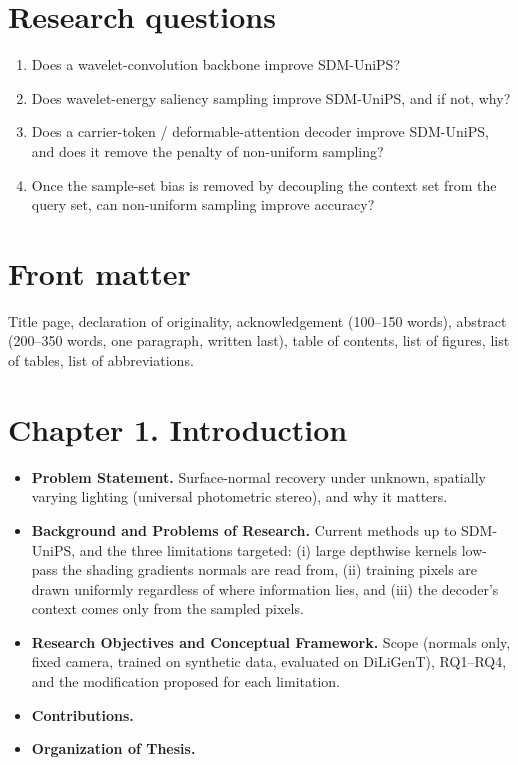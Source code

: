 \documentclass[Main.tex]{subfiles}
\begin{document}
\section*{Research questions}

\begin{enumerate}[label=\textbf{RQ\arabic*.}, leftmargin=*]
  \item Does a wavelet-convolution backbone improve SDM-UniPS?
  \item Does wavelet-energy saliency sampling improve SDM-UniPS, and if not, why?
  \item Does a carrier-token / deformable-attention decoder improve SDM-UniPS, and does it remove
    the penalty of non-uniform sampling?
  \item Once the sample-set bias is removed by decoupling the context set from the query set, can
    non-uniform sampling improve accuracy?
\end{enumerate}

\section*{Front matter}
Title page, declaration of originality, acknowledgement (100--150 words), abstract (200--350
words, one paragraph, written last), table of contents, list of figures, list of tables, list of
abbreviations.

\section*{Chapter 1. Introduction }
\begin{itemize}
  \item[1.1] \textbf{Problem Statement.} Surface-normal recovery under unknown, spatially varying
    lighting (universal photometric stereo), and why it matters.
  \item[1.2] \textbf{Background and Problems of Research.} Current methods up to SDM-UniPS, and the
    three limitations targeted: (i) large depthwise kernels low-pass the shading gradients normals
    are read from, (ii) training pixels are drawn uniformly regardless of where information lies,
    and (iii) the decoder's context comes only from the sampled pixels.
  \item[1.3] \textbf{Research Objectives and Conceptual Framework.} Scope (normals only, fixed
    camera, trained on synthetic data, evaluated on DiLiGenT), RQ1--RQ4, and the modification
    proposed for each limitation.
  \item[1.4] \textbf{Contributions.}
  \item[1.5] \textbf{Organization of Thesis.}
\end{itemize}
\end{document}
